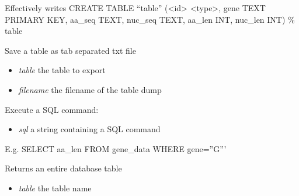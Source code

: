 \documentclass[a4paper,11pt,english]{sphinxmanual}
\begin{document}
\begin{fulllineitems}
\begin{fulllineitems}
\begin{itemize}
\end{itemize}

Effectively writes CREATE TABLE ``table'' (\textless{}id\textgreater{} \textless{}type\textgreater{}, gene TEXT PRIMARY KEY, aa\_seq TEXT, nuc\_seq TEXT, aa\_len INT, nuc\_len INT) \% table

\end{fulllineitems}


\begin{fulllineitems}
\label{modules_doc:cbmpy.CBNetDB.DBTools.dumpTableToTxt}
Save a table as tab separated txt file
\begin{itemize}
\item {} 
\emph{table} the table to export

\item {} 
\emph{filename} the filename of the table dump

\end{itemize}

\end{fulllineitems}


\begin{fulllineitems}
\label{modules_doc:cbmpy.CBNetDB.DBTools.executeSQL}
Execute a SQL command:
\begin{itemize}
\item {} 
\emph{sql} a string containing a SQL command

\end{itemize}

\end{fulllineitems}


\begin{fulllineitems}
\label{modules_doc:cbmpy.CBNetDB.DBTools.fetchAll}
E.g. SELECT aa\_len FROM gene\_data WHERE gene=''G'''

\end{fulllineitems}


\begin{fulllineitems}
\label{modules_doc:cbmpy.CBNetDB.DBTools.getTable}
Returns an entire database table
\begin{itemize}
\item {} 
\emph{table} the table name


\end{itemize}
\end{fulllineitems}
\end{fulllineitems}
\end{document}
